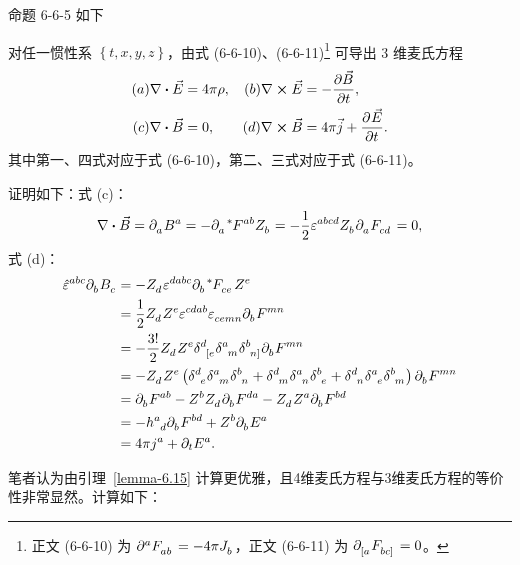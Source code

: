 \begin{xiti}
		\begin{zm}
			命题 6-6-5 如下
			\begin{Proposition}
				对任一惯性系 $\left\{ t,x,y,z\right\}$，由式 (6-6-10)、(6-6-11)\footnote{正文 (6-6-10) 为 $\tensor{\partial}{^a} \tensor{F}{_a_b} = - 4\pi \tensor{J}{_b}$，正文 (6-6-11) 为 $\tensor{\partial}{_{[a}} \tensor{F}{_{bc]}} = 0$。} 可导出 3 维麦氏方程
				\begin{align*}
					(a) \nabla \vdot \myvec{E} &= 4\pi \rho, & (b) \nabla \cross \myvec{E} &= - \pdv{\myvec{B}}{t},\\
					(c) \nabla \vdot \myvec{B} &= 0 , & (d) \nabla \cross \myvec{B} &= 4\pi \myvec{j} + \pdvt{\myvec{E}}.
				\end{align*}
				其中第一、四式对应于式 (6-6-10)，第二、三式对应于式 (6-6-11)。
			\end{Proposition}
			证明如下：式 (c)：
			\begin{equation*}
				\nabla\vdot\myvec{B} = \tensor{\partial}{_a} \tensor{B}{^a} = - \tensor{\partial}{_a} \tensor[^*]{F}{^a^b} \tensor{Z}{_b} = - \frac{1}{2} \tensor{\varepsilon}{^a^b^c^d} \tensor{Z}{_b} \tensor{\partial}{_a} \tensor{F}{_c_d} = 0,
			\end{equation*}
			式 (d)：
			\begin{equation*}
				\begin{split}
					\tensor{\hat{\varepsilon}}{^a^b^c} \tensor{\partial}{_b} \tensor{B}{_c} &= - \tensor{Z}{_d} \tensor{\varepsilon}{^d^a^b^c} \tensor{\partial}{_b} \tensor[^*]{F}{_c_e} \tensor{Z}{^e}\\
					&= \frac{1}{2} \tensor{Z}{_d} \tensor{Z}{^e} \tensor{\varepsilon}{^c^d^a^b} \tensor{\varepsilon}{_c_e_m_n} \tensor{\partial}{_b} \tensor{F}{^m^n}\\
					&= - \frac{3!}{2} \tensor{Z}{_d} \tensor{Z}{^e} \tensor{\delta}{^d_{[e}} \tensor{\delta}{^a_m} \tensor{\delta}{^b_{n]}} \tensor{\partial}{_b} \tensor{F}{^m^n}\\
					&= - \tensor{Z}{_d} \tensor{Z}{^e} \left( \tensor{\delta}{^d_e} \tensor{\delta}{^a_m} \tensor{\delta}{^b_n} + \tensor{\delta}{^d_m} \tensor{\delta}{^a_n} \tensor{\delta}{^b_e} + \tensor{\delta}{^d_n} \tensor{\delta}{^a_e} \tensor{\delta}{^b_m} \right) \tensor{\partial}{_b} \tensor{F}{^m^n}\\
					&= \tensor{\partial}{_b} \tensor{F}{^a^b} - \tensor{Z}{^b} \tensor{Z}{_d} \tensor{\partial}{_b} \tensor{F}{^d^a} - \tensor{Z}{_d} \tensor{Z}{^a} \tensor{\partial}{_b} \tensor{F}{^b^d}\\
					&= -\tensor{h}{^a_d} \tensor{\partial}{_b} \tensor{F}{^b^d} + \tensor{Z}{^b} \tensor{\partial}{_b} \tensor{E}{^a}\\
					&= 4\pi \tensor{j}{^a} + \partial_t \tensor{E}{^a}.
				\end{split}
			\end{equation*}
			\begin{tcolorbox}[breakable,title=补充,fonttitle=\normalfont\bfseries]
				笔者认为由引理~\ref{lemma-6.15} 计算更优雅，且4维麦氏方程与3维麦氏方程的等价性非常显然。计算如下：


\end{tcolorbox}
\end{zm}
\end{xiti}
